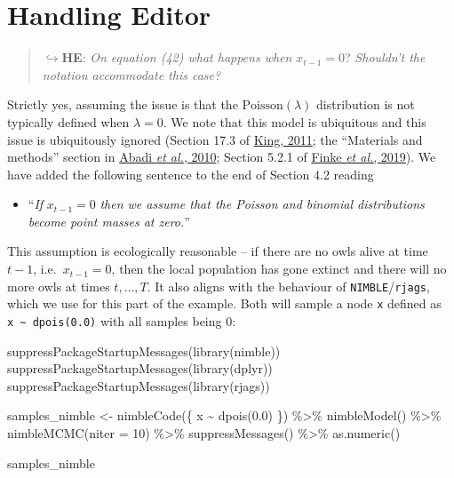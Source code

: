 \documentclass[
  10pt,
  a4paper,
]{article}
\newenvironment{Shaded}{\begin{snugshade}}{\end{snugshade}}
\newcommand{\AttributeTok}[1]{\textcolor[rgb]{0.77,0.63,0.00}{#1}}
\newcommand{\DecValTok}[1]{\textcolor[rgb]{0.00,0.00,0.81}{#1}}
\newcommand{\FloatTok}[1]{\textcolor[rgb]{0.00,0.00,0.81}{#1}}
\newcommand{\FunctionTok}[1]{\textcolor[rgb]{0.00,0.00,0.00}{#1}}
\newcommand{\NormalTok}[1]{#1}
\newcommand{\OtherTok}[1]{\textcolor[rgb]{0.56,0.35,0.01}{#1}}
\newcommand{\SpecialCharTok}[1]{\textcolor[rgb]{0.00,0.00,0.00}{#1}}
\providecommand{\tightlist}{%
  \setlength{\itemsep}{0pt}\setlength{\parskip}{0pt}}
\begin{document}
\hypertarget{handling-editor}{%
\section*{Handling Editor}\label{handling-editor}}

\begin{quote}
\(\hookrightarrow\)\textbf{HE}: \emph{On equation (42) what happens
when} \(x_{t - 1} = 0\)? \emph{Shouldn't the notation accommodate this
case?}
\end{quote}

Strictly yes, assuming the issue is that the \(\text{Poisson}(\lambda)\)
distribution is not typically defined when \(\lambda = 0\). We note that
this model is ubiquitous and this issue is ubiquitously ignored (Section
17.3 of \protect\hyperlink{ref-king_statistical_2011}{King, 2011}; the
``Materials and methods'' section in
\protect\hyperlink{ref-abadi_estimation_2010}{Abadi \emph{et al.},
2010}; Section 5.2.1 of
\protect\hyperlink{ref-finke_efficient_2019}{Finke \emph{et al.},
2019}). We have added the following sentence to the end of Section 4.2
reading

\begin{itemize}
\tightlist
\item
  ``\emph{If} \(x_{t - 1} = 0\) \emph{then we assume that the Poisson
  and binomial distributions become point masses at zero.}''
\end{itemize}

This assumption is ecologically reasonable -- if there are no owls alive
at time \(t - 1\), i.e.~\(x_{t - 1} = 0\), then the local population has
gone extinct and there will no more owls at times \(t, \ldots, T\). It
also aligns with the behaviour of \texttt{NIMBLE}/\texttt{rjags}, which
we use for this part of the example. Both will sample a node \texttt{x}
defined as \texttt{x\ \textasciitilde{}\ dpois(0.0)} with all samples
being \(0\):

\begin{Shaded}
\begin{Highlighting}[]
\FunctionTok{suppressPackageStartupMessages}\NormalTok{(}\FunctionTok{library}\NormalTok{(nimble))}
\FunctionTok{suppressPackageStartupMessages}\NormalTok{(}\FunctionTok{library}\NormalTok{(dplyr))}
\FunctionTok{suppressPackageStartupMessages}\NormalTok{(}\FunctionTok{library}\NormalTok{(rjags))}

\NormalTok{samples\_nimble }\OtherTok{\textless{}{-}} \FunctionTok{nimbleCode}\NormalTok{(\{}
\NormalTok{  x }\SpecialCharTok{\textasciitilde{}} \FunctionTok{dpois}\NormalTok{(}\FloatTok{0.0}\NormalTok{)}
\NormalTok{\}) }\SpecialCharTok{\%\textgreater{}\%}
  \FunctionTok{nimbleModel}\NormalTok{() }\SpecialCharTok{\%\textgreater{}\%}
  \FunctionTok{nimbleMCMC}\NormalTok{(}\AttributeTok{niter =} \DecValTok{10}\NormalTok{) }\SpecialCharTok{\%\textgreater{}\%}
  \FunctionTok{suppressMessages}\NormalTok{() }\SpecialCharTok{\%\textgreater{}\%}
  \FunctionTok{as.numeric}\NormalTok{()}

\NormalTok{samples\_nimble}
\end{Highlighting}
\end{Shaded}
\end{document}
